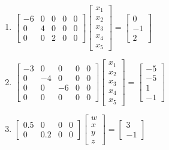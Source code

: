 \begin{exercise}
\begin{enumerate}
\item \(\begin{bmatrix} -6&0&0&0&0
\\0&4&0&0&0
\\0&0&2&0&0 \end{bmatrix}
\begin{bmatrix}x_1\\x_2\\x_3\\x_4\\x_5\end{bmatrix}
=\begin{bmatrix} 0
\\-1
\\2 \end{bmatrix}\)

\item \(\begin{bmatrix} -3&0&0&0&0
\\0&-4&0&0&0
\\0&0&-6&0&0
\\0&0&0&0&0 \end{bmatrix}
\begin{bmatrix}x_1\\x_2\\x_3\\x_4\\x_5\end{bmatrix}
=\begin{bmatrix} -5
\\-5
\\1
\\-1 \end{bmatrix}\)

\item \(\begin{bmatrix} 0.5&0&0&0
\\0&0.2&0&0 \end{bmatrix}
\begin{bmatrix}w\\x\\y\\z\end{bmatrix}
=\begin{bmatrix} 3
\\-1 \end{bmatrix}\)


\end{enumerate}
\end{exercise}
